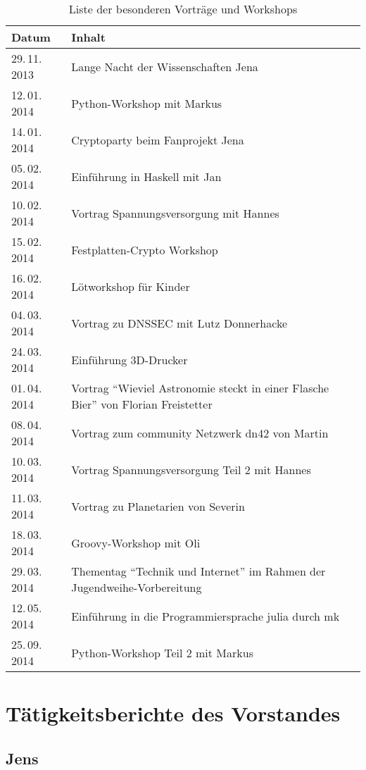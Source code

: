 \documentclass[ngerman]{scrartcl}
\begin{document}
\begin{table}[h]
  \centering{}
  \begin{tabularx}{\textwidth}{l|X}
	\textbf{Datum} & \textbf{Inhalt} \\ \midrule
	29.\,11.\,2013 & Lange Nacht der Wissenschaften Jena \\
	12.\,01.\,2014 & Python-Workshop mit Markus \\
	14.\,01.\,2014 & Cryptoparty beim Fanprojekt Jena \\
	05.\,02.\,2014 & Einführung in Haskell mit Jan \\
	10.\,02.\,2014 & Vortrag Spannungsversorgung mit Hannes \\
	15.\,02.\,2014 & Festplatten-Crypto Workshop \\
	16.\,02.\,2014 & Lötworkshop für Kinder \\
	04.\,03.\,2014 & Vortrag zu DNSSEC mit Lutz Donnerhacke \\
	24.\,03.\,2014 & Einführung 3D-Drucker \\
	01.\,04.\,2014 & Vortrag "`Wieviel Astronomie steckt in einer Flasche Bier"' von Florian Freistetter \\
	08.\,04.\,2014 & Vortrag zum community Netzwerk dn42 von Martin \\
	10.\,03.\,2014 & Vortrag Spannungsversorgung Teil 2 mit Hannes \\
	11.\,03.\,2014 & Vortrag zu Planetarien von Severin \\
	18.\,03.\,2014 & Groovy-Workshop mit Oli \\
	29.\,03.\,2014 & Thementag "`Technik und Internet"' im Rahmen der Jugendweihe-Vorbereitung \\
	12.\,05.\,2014 & Einführung in die Programmiersprache julia durch mk \\
	25.\,09.\,2014 & Python-Workshop Teil 2 mit Markus \\
\bottomrule
	\end{tabularx}
	\caption{Liste der besonderen Vorträge und Workshops}
\end{table}

\section{Tätigkeitsberichte des Vorstandes}

\subsection{Jens}
\end{document}
